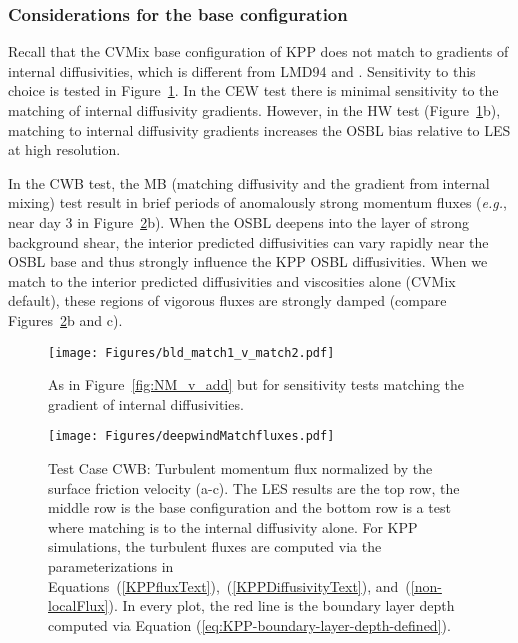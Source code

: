\documentclass[preprint,12pt,authoryear]{agujournal}
\begin{document}
\subsubsection{Considerations for the base configuration}

Recall that the CVMix base configuration of KPP does not match to gradients of internal diffusivities, which is different from LMD94 and \cite{Danabasoglu2006}.  Sensitivity to this choice is tested in Figure~\ref{fig:mbTest}.  In the CEW test there is minimal sensitivity to the matching of internal diffusivity gradients.  However, in the HW test (Figure~\ref{fig:mbTest}b), matching to internal diffusivity gradients increases the OSBL bias relative to LES at high resolution.

In the CWB test, the MB (matching diffusivity and the gradient from internal mixing) test result in brief periods of anomalously strong momentum fluxes (\textit{e.g.}, near day 3 in Figure~\ref{wind2_fluxes_matching}b).  When the OSBL deepens into the layer of strong background shear, the interior predicted diffusivities can vary rapidly near the OSBL base and thus strongly influence the KPP OSBL diffusivities.  When we match to the interior predicted diffusivities and viscosities alone (CVMix default), these regions of vigorous fluxes are strongly damped (compare Figures~\ref{wind2_fluxes_matching}b and c).

\begin{figure}[thbp]
	\centering\texttt{[image: Figures/bld\_match1\_v\_match2.pdf]}
	\caption{As in Figure~\ref{fig:NM_v_add} but for sensitivity tests matching the gradient of internal diffusivities.}
	\label{fig:mbTest}
\end{figure}

\begin{figure}[hbtp]
\centering\texttt{[image: Figures/deepwindMatchfluxes.pdf]}
\caption{Test Case CWB: Turbulent momentum flux normalized by the surface friction velocity (a-c).  The LES results are the top row, the middle row is the base configuration and the bottom row is a test where matching is to the internal diffusivity alone.  For KPP simulations, the turbulent fluxes are computed via the parameterizations in Equations~(\ref{KPPfluxText}),~(\ref{KPPDiffusivityText}), and~(\ref{non-localFlux}).  In every plot, the red line is the boundary layer depth computed via Equation (\ref{eq:KPP-boundary-layer-depth-defined}).}
\label{wind2_fluxes_matching}
\end{figure}
\end{document}
